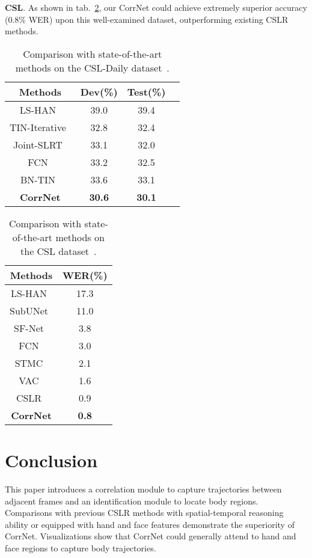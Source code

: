 \documentclass[10pt,twocolumn,letterpaper]{article}
\begin{document}
\textbf{CSL}. As shown in tab.~\ref{tab10}, our CorrNet could achieve extremely superior accuracy (0.8\% WER) upon this well-examined dataset, outperforming existing CSLR methods.

\begin{table}[t]   
  \centering
  \setlength\tabcolsep{2pt}
  \begin{tabular}{cccc}
  \hline
  Methods&  Dev(\%) & Test(\%)\\
  \hline
LS-HAN~\cite{huang2018video}  & 39.0  & 39.4\\
  TIN-Iterative~\cite{cui2019deep}  & 32.8  & 32.4\\
  Joint-SLRT~\cite{camgoz2020sign}  & 33.1  & 32.0 \\
  FCN~\cite{cheng2020fully} & 33.2  & 32.5 \\
  BN-TIN~\cite{zhou2021improving} & 33.6  & 33.1 \\
\hline
\textbf{CorrNet} & \textbf{30.6} & \textbf{30.1} \\
  \hline
  \end{tabular}  
  \caption{Comparison with state-of-the-art methods on the CSL-Daily dataset~\cite{zhou2021improving}.} 
  \label{tab9}
  \end{table}

\begin{table}[t]   
  \centering
  \setlength\tabcolsep{2pt}
  \begin{tabular}{cc}
    \hline
    Methods&  WER(\%)\\
    \hline
    LS-HAN~\cite{huang2018video}  & 17.3 \\
    SubUNet~\cite{cihan2017subunets}   & 11.0\\
    SF-Net~\cite{yang2019sf} & 3.8 \\
    FCN~\cite{cheng2020fully}   & 3.0 \\
    STMC~\cite{zhou2020spatial}  & 2.1 \\
    VAC~\cite{Min_2021_ICCV} & 1.6 \\
    CSLR~\cite{zuo2022c2slr} & 0.9 \\
    \hline
\textbf{CorrNet} & \textbf{0.8} \\
    \hline
    \end{tabular}  
    \caption{Comparison with state-of-the-art methods on the CSL dataset~\cite{huang2018video}.} 
    \label{tab10}
    \vspace{-5px}
  \end{table}

\section{Conclusion}
This paper introduces a correlation module to capture trajectories between adjacent frames and an identification module to locate body regions. Comparisons with previous CSLR methods with spatial-temporal reasoning ability or equipped with hand and face features demonstrate the superiority of CorrNet. Visualizations show that CorrNet could generally attend to hand and face regions to capture body trajectories.
{\small


}
\end{document}
